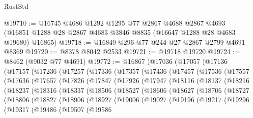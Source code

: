 \begin{lexlean}{RustStd}
\begin{coremodule}
@19710 := @16745
    @4686
    @1292
    @1295
    @77
    @2867
    @4688
    @2867
    @4693
    (@16851 @1288 @28 @2867 @4683 @3846 @8835 (@16647 @1288 @28 @4683 @19680) @16865)
@19718 := @16849 @296 @77 @244 @27 @2867 @2799 @4691 @8369
@19720 := @8378 @8042 @2533
@19721 := @19718 @19720
@19724 := @8462 (@9032 @77 @4691)
@19772 := @16867
    (@17036
      (@17057
        (@17136
          (@17157
            (@17236
              (@17257
                (@17336
                  (@17357
                    (@17436
                      (@17457
                        (@17536
                          (@17557
                            (@17636
                              (@17657
                                (@17826
                                  (@17847
                                    (@17926
                                      (@17947
                                        (@18116
                                          (@18137
                                            (@18216
                                              (@18237
                                                (@18316
                                                  (@18337
                                                    (@18506
                                                      (@18527
                                                        (@18606
                                                          (@18627
                                                            (@18706
                                                              (@18727
                                                                (@18806
                                                                  (@18827
                                                                    (@18906
                                                                      (@18927
                                                                        (@19006
                                                                          (@19027
                                                                            (@19196
                                                                              (@19217
                                                                                (@19296
                                                                                  (@19317
                                                                                    (@19486
                                                                                      (@19507
                                                                                        (@19586

\end{coremodule}
\end{lexlean}
